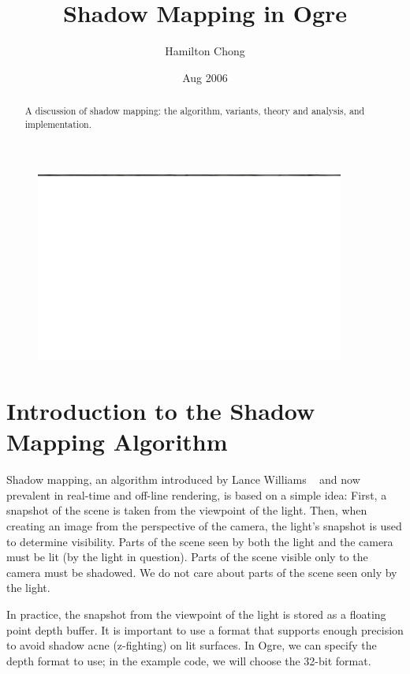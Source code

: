 \documentclass[]{article}  %
\begin{document}
\begin{figure}
	\centering
		\includegraphics[width=4in]{figure/OgreHead.eps}
	\label{OgreHead}
\end{figure}


\title{Shadow Mapping in Ogre}   %
\author{\small Hamilton Chong}         %
\date{\small Aug 2006}    %
\maketitle

\newpage

\begin{abstract}
A discussion of shadow mapping: the algorithm, variants, theory and analysis, and implementation.
\end{abstract}

\section{Introduction to the Shadow Mapping Algorithm}            
\label{Introduction}


Shadow mapping, an algorithm introduced by Lance Williams ~\cite{WIL78} and now prevalent in real-time and off-line rendering, is based on a simple idea:  First, a snapshot of the scene is taken from the viewpoint of the light.  Then, when creating an image from the perspective of the camera, the light's snapshot is used to determine visibility.  Parts of the scene seen by both the light and the camera must be lit (by the light in question).  Parts of the scene visible only to the camera must be shadowed.  We do not care about parts of the scene seen only by the light.  

In practice, the snapshot from the viewpoint of the light is stored as a floating point depth buffer.  It is important to use a format that supports enough precision to avoid shadow acne (z-fighting) on lit surfaces.  In Ogre, we can specify the depth format to use; in the example code, we will choose the 32-bit format. 
\end{document}
